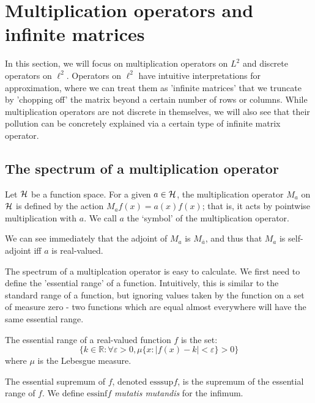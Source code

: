\documentclass[../main.tex]{subfiles}
\begin{document}
\section{Multiplication operators and infinite matrices}
In this section, we will focus on multiplication operators on $L^2$ and
discrete operators on $\ell^2$. Operators on $\ell^2$ have intuitive
interpretations for approximation, where we can treat them as 'infinite
matrices' that we truncate by 'chopping off' the matrix beyond a certain number
of rows or columns. While multiplication operators are not discrete in
themselves, we will also see that their pollution can be concretely explained
via a certain type of infinite matrix operator.

\subsection{The spectrum of a multiplication operator}
\begin{definition}
Let $\mathcal{H}$ be a function space. For a given $a \in \mathcal{H}$, the
multiplication operator $M_a$ on $\mathcal{H}$ is defined by the action
$M_af(x) = a(x)f(x)$; that is, it acts by pointwise multiplication with
$a$. We call $a$ the `symbol' of the multiplication operator.
\end{definition}

We can see immediately that the adjoint of $M_a$ is $M_{\overline{a}}$, and thus
that $M_a$ is self-adjoint iff $a$ is real-valued.

The spectrum of a multiplcation operator is easy to calculate. We first
need to define the 'essential range' of a function. Intuitively, this is
similar to the standard range of a function, but ignoring values taken by
the function on a set of measure zero - two functions which are equal
almost everywhere will have the same essential range.

\begin{definition}
\label{defn:essential-range}
The essential range of a real-valued function $f$ is the set:
 $$\{k \in \mathbb{R} : \forall \varepsilon > 0, \mu\{x : |f(x) - k| < \varepsilon\} > 0\}$$
where $\mu$ is the Lebesgue measure.
  
The essential supremum of $f$, denoted $\mathrm{esssup}f$, is the supremum of
the essential range of $f$. We define $\mathrm{essinf}f$ \emph{mutatis
mutandis} for the infimum.
\end{definition}
\end{document}
